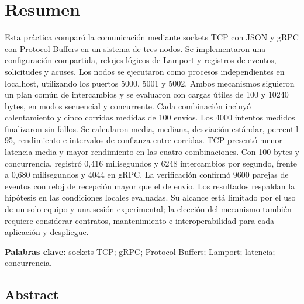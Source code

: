 \noindent\begin{minipage}[t]{\linewidth}
\section*{Resumen}

Esta práctica comparó la comunicación mediante sockets TCP con JSON y gRPC con
Protocol Buffers en un sistema de tres nodos. Se implementaron una configuración
compartida, relojes lógicos de Lamport y registros de eventos, solicitudes y acuses.
Los nodos se ejecutaron como procesos independientes en localhost, utilizando los
puertos 5000, 5001 y 5002. Ambos mecanismos siguieron un plan común de intercambios
y se evaluaron con cargas útiles de 100 y 10240 bytes, en modos secuencial y
concurrente. Cada combinación incluyó calentamiento y cinco corridas medidas de
100 envíos. Los 4000 intentos medidos finalizaron sin fallos. Se calcularon media,
mediana, desviación estándar, percentil 95, rendimiento e intervalos de confianza
entre corridas. TCP presentó menor latencia media y mayor rendimiento en las
cuatro combinaciones. Con 100 bytes y concurrencia, registró 0,416 milisegundos y
6248 intercambios por segundo, frente a 0,680 milisegundos y 4044 en gRPC. La
verificación confirmó 9600 parejas de eventos con reloj de recepción mayor que
el de envío. Los resultados respaldan la hipótesis en las condiciones locales
evaluadas. Su alcance está limitado por el uso de un solo equipo y una sesión
experimental; la elección del mecanismo también requiere considerar contratos,
mantenimiento e interoperabilidad para cada aplicación y despliegue.

\medskip
\noindent\textbf{Palabras clave:} sockets TCP; gRPC; Protocol Buffers; Lamport;
latencia; concurrencia.

\begin{otherlanguage}{english}
\section*{Abstract}


\end{otherlanguage}
\end{minipage}
